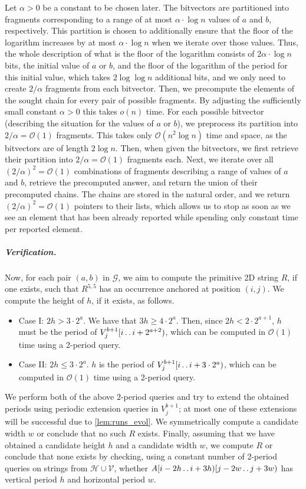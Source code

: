\documentclass[11pt,letterpaper]{article}
\newcommand{\cO}{\mathcal{O}}
\def\dd{\mathinner{.\,.}}
\newcommand{\vmeta}[2]{V_{#1}^{#2}}
\begin{document}
Let $\alpha>0$ be a constant to be chosen later.
The bitvectors are partitioned into fragments corresponding to a range of at most $\alpha \cdot \log n$ values of $a$ and $b$, respectively.
This partition is chosen to additionally ensure that the floor of the logarithm increases by at most $\alpha \cdot \log n$ when we iterate over
those values. Thus, the whole description of what is the floor of the logarithm consists of $2\alpha\cdot \log n$ bits,
the initial value of $a$ or $b$, and the floor of the logarithm of the period for this initial value, which takes
$2\log\log n$ additional bits, and we only need to create $2/\alpha$ fragments from each bitvector.
Then, we precompute the elements of the sought chain for every pair of possible fragments. By adjusting the sufficiently
small constant $\alpha>0$ this takes $o(n)$ time.
For each possible bitvector (describing the situation for the values of $a$ or $b$), we preprocess its partition
into $2/\alpha=\cO(1)$ fragments. This takes only $\cO(n^{2}\log n)$ time and space, as the bitvectors are of length $2\log n$.
Then, when given the bitvectors, we first retrieve their partition into $2/\alpha=\cO(1)$ fragments each.
Next, we iterate over all $(2/\alpha)^{2}=\cO(1)$ combinations of fragments describing a range of values of $a$ and $b$,
retrieve the precomputed answer, and return the union of their precomputed chains.
The chains are stored in the natural order, and we return $(2/\alpha)^{2}=\cO(1)$ pointers to their lists,
which allows us to stop as soon as we see an element that has been already reported while spending only
constant time per reported element.

\subparagraph*{Verification.}
Now, for each pair $(a,b)$ in $\mathcal{G}$, we aim to compute the primitive 2D string $R$, if one exists, such that $R^{5,5}$ has an occurrence anchored at position $(i,j)$.
We compute the height of $h$, if it exists, as follows.
\begin{itemize}
\item Case I: $2h> 3\cdot 2^a$. We have that $3h\geq  4\cdot 2^{a}$.
Then, since $2h< 2\cdot 2^{a+1}$, $h$ must be the period of $\vmeta{j}{b+1}[i \dd i+2^{a+2})$, which can be computed in $\cO(1)$ time using a 2-period query.
\item Case II: $2h \leq 3\cdot 2^a$. $h$ is the period of $\vmeta{j}{b+1}[i \dd i+3\cdot 2^a)$, which can be computed in $\cO(1)$ time using a 2-period query.
\end{itemize}
We perform both of the above $2$-period queries and try to extend the obtained periods using periodic extension queries in $\vmeta{j}{b+1}$; at most one of these extensions will be successful due to \cref{lem:runs_evol}.
We symmetrically compute a candidate width $w$ or conclude that no such $R$ exists.
Finally, assuming that we have obtained a candidate height $h$ and a candidate width $w$, we compute $R$ or conclude that none exists by checking, using a constant number of 2-period queries on strings from $\mathcal{H} \cup \mathcal{V}$, whether $A[i-2h \dd i+3h)[j-2w \dd j+3w)$ has vertical period $h$ and horizontal period $w$.
\end{document}

